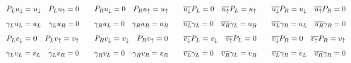 \begin{gather*}
        \resizebox{\linewidth}{!}{$\displaystyle
                P_Lu_\downarrow = u_\downarrow
                \quad
                P_Lu_\uparrow = 0
                \qquad
                P_Ru_\downarrow = 0
                \quad
                P_Ru_\uparrow = u_\uparrow
                \qquad
                \overline{u_\downarrow}P_L = 0
                \quad
                \overline{u_\uparrow}P_L = u_\uparrow
                \qquad
                \overline{u_\downarrow}P_R = u_\downarrow
                \quad
                \overline{u_\uparrow}P_R = 0
        $}
        \\\resizebox{\linewidth}{!}{$\displaystyle
                \gamma_Lu_L = u_L
                \quad
                \gamma_Lu_R = 0
                \qquad
                \gamma_Ru_L = 0
                \quad
                \gamma_Ru_R = u_R
                \qquad
                \overline{u_L}\gamma_L = 0
                \quad
                \overline{u_R}\gamma_L = u_R
                \qquad
                \overline{u_L}\gamma_R = u_L
                \quad
                \overline{u_R}\gamma_R = 0
        $}
        \\\resizebox{\linewidth}{!}{$\displaystyle
                P_Lv_\downarrow = 0
                \quad
                P_Lv_\uparrow = v_\uparrow
                \qquad
                P_Rv_\downarrow = v_\downarrow
                \quad
                P_Rv_\uparrow = 0
                \qquad
                \overline{v_\downarrow}P_L = v_\downarrow
                \quad
                \overline{v_\uparrow}P_L = 0
                \qquad
                \overline{v_\downarrow}P_R = 0
                \quad
                \overline{v_\uparrow}P_R =v_\uparrow
        $}
        \\\resizebox{\linewidth}{!}{$\displaystyle
                \gamma_Lv_L = v_L
                \quad
                \gamma_Lv_R = 0
                \qquad
                \gamma_Rv_L = 0
                \quad
                \gamma_Rv_R = v_R
                \qquad
                \overline{v_L}\gamma_L = 0
                \quad
                \overline{v_R}\gamma_L = v_R
                \qquad
                \overline{v_L}\gamma_R = v_L
                \quad
                \overline{v_R}\gamma_R = 0
        $}
\end{gather*}

